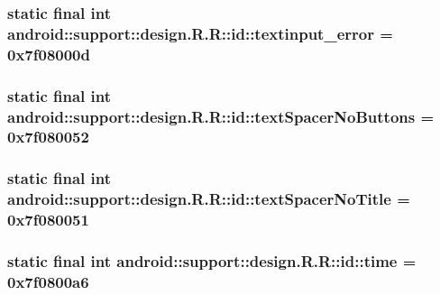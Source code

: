 \hypertarget{classandroid_1_1support_1_1design_1_1_r_1_1id_3b89cda3d256e5842e163931e8de74e6}{
\subsubsection[{textinput\_\-error}]{\setlength{\rightskip}{0pt plus 5cm}static final int android::support::design.R.R::id::textinput\_\-error = 0x7f08000d}}
\label{classandroid_1_1support_1_1design_1_1_r_1_1id_3b89cda3d256e5842e163931e8de74e6}


\hypertarget{classandroid_1_1support_1_1design_1_1_r_1_1id_fe0fd3562d80620e4a02ffdb5bfcf615}{
\subsubsection[{textSpacerNoButtons}]{\setlength{\rightskip}{0pt plus 5cm}static final int android::support::design.R.R::id::textSpacerNoButtons = 0x7f080052}}
\label{classandroid_1_1support_1_1design_1_1_r_1_1id_fe0fd3562d80620e4a02ffdb5bfcf615}


\hypertarget{classandroid_1_1support_1_1design_1_1_r_1_1id_57c06d75dff8cd9514b113f064103d7b}{
\subsubsection[{textSpacerNoTitle}]{\setlength{\rightskip}{0pt plus 5cm}static final int android::support::design.R.R::id::textSpacerNoTitle = 0x7f080051}}
\label{classandroid_1_1support_1_1design_1_1_r_1_1id_57c06d75dff8cd9514b113f064103d7b}


\hypertarget{classandroid_1_1support_1_1design_1_1_r_1_1id_0c004fe163c4772bd74e56521ffb60a2}{
\subsubsection[{time}]{\setlength{\rightskip}{0pt plus 5cm}static final int android::support::design.R.R::id::time = 0x7f0800a6}}
\label{classandroid_1_1support_1_1design_1_1_r_1_1id_0c004fe163c4772bd74e56521ffb60a2}



